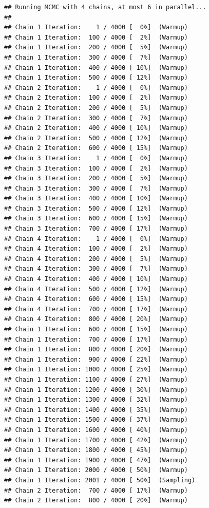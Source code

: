 \documentclass[
]{article}
\begin{document}
\begin{verbatim}
## Running MCMC with 4 chains, at most 6 in parallel...
## 
## Chain 1 Iteration:    1 / 4000 [  0%]  (Warmup) 
## Chain 1 Iteration:  100 / 4000 [  2%]  (Warmup) 
## Chain 1 Iteration:  200 / 4000 [  5%]  (Warmup) 
## Chain 1 Iteration:  300 / 4000 [  7%]  (Warmup) 
## Chain 1 Iteration:  400 / 4000 [ 10%]  (Warmup) 
## Chain 1 Iteration:  500 / 4000 [ 12%]  (Warmup) 
## Chain 2 Iteration:    1 / 4000 [  0%]  (Warmup) 
## Chain 2 Iteration:  100 / 4000 [  2%]  (Warmup) 
## Chain 2 Iteration:  200 / 4000 [  5%]  (Warmup) 
## Chain 2 Iteration:  300 / 4000 [  7%]  (Warmup) 
## Chain 2 Iteration:  400 / 4000 [ 10%]  (Warmup) 
## Chain 2 Iteration:  500 / 4000 [ 12%]  (Warmup) 
## Chain 2 Iteration:  600 / 4000 [ 15%]  (Warmup) 
## Chain 3 Iteration:    1 / 4000 [  0%]  (Warmup) 
## Chain 3 Iteration:  100 / 4000 [  2%]  (Warmup) 
## Chain 3 Iteration:  200 / 4000 [  5%]  (Warmup) 
## Chain 3 Iteration:  300 / 4000 [  7%]  (Warmup) 
## Chain 3 Iteration:  400 / 4000 [ 10%]  (Warmup) 
## Chain 3 Iteration:  500 / 4000 [ 12%]  (Warmup) 
## Chain 3 Iteration:  600 / 4000 [ 15%]  (Warmup) 
## Chain 3 Iteration:  700 / 4000 [ 17%]  (Warmup) 
## Chain 4 Iteration:    1 / 4000 [  0%]  (Warmup) 
## Chain 4 Iteration:  100 / 4000 [  2%]  (Warmup) 
## Chain 4 Iteration:  200 / 4000 [  5%]  (Warmup) 
## Chain 4 Iteration:  300 / 4000 [  7%]  (Warmup) 
## Chain 4 Iteration:  400 / 4000 [ 10%]  (Warmup) 
## Chain 4 Iteration:  500 / 4000 [ 12%]  (Warmup) 
## Chain 4 Iteration:  600 / 4000 [ 15%]  (Warmup) 
## Chain 4 Iteration:  700 / 4000 [ 17%]  (Warmup) 
## Chain 4 Iteration:  800 / 4000 [ 20%]  (Warmup) 
## Chain 1 Iteration:  600 / 4000 [ 15%]  (Warmup) 
## Chain 1 Iteration:  700 / 4000 [ 17%]  (Warmup) 
## Chain 1 Iteration:  800 / 4000 [ 20%]  (Warmup) 
## Chain 1 Iteration:  900 / 4000 [ 22%]  (Warmup) 
## Chain 1 Iteration: 1000 / 4000 [ 25%]  (Warmup) 
## Chain 1 Iteration: 1100 / 4000 [ 27%]  (Warmup) 
## Chain 1 Iteration: 1200 / 4000 [ 30%]  (Warmup) 
## Chain 1 Iteration: 1300 / 4000 [ 32%]  (Warmup) 
## Chain 1 Iteration: 1400 / 4000 [ 35%]  (Warmup) 
## Chain 1 Iteration: 1500 / 4000 [ 37%]  (Warmup) 
## Chain 1 Iteration: 1600 / 4000 [ 40%]  (Warmup) 
## Chain 1 Iteration: 1700 / 4000 [ 42%]  (Warmup) 
## Chain 1 Iteration: 1800 / 4000 [ 45%]  (Warmup) 
## Chain 1 Iteration: 1900 / 4000 [ 47%]  (Warmup) 
## Chain 1 Iteration: 2000 / 4000 [ 50%]  (Warmup) 
## Chain 1 Iteration: 2001 / 4000 [ 50%]  (Sampling) 
## Chain 2 Iteration:  700 / 4000 [ 17%]  (Warmup) 
## Chain 2 Iteration:  800 / 4000 [ 20%]  (Warmup) 

\end{verbatim}
\end{document}

